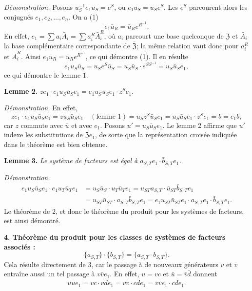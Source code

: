 \noindent\emph{Démonstration.} Posons \(u_S^{-1}e_1u_S=e^S\), ou \(e_1u_S=u_Se^S\). Les \(e^S\) parcourent alors les conjugués \(e_1,e_2,\ldots,e_n\). On a (1)
\[
e_1\bar u_R=\bar u_Re^{R^{-1}}.
\]
En effet, \(e_1=\sum a_i\bar A_i=\sum a_i^R\bar A_i^R\), où \(a_i\) parcourt une base quelconque de \(\mathfrak Z\) et \(\bar A_i\) la base complémentaire correspondante de \(\overline{\mathfrak Z}\); la même relation vaut donc pour \(a_i^R\) et \(\bar A_i^R\). Ainsi \(e_1\bar u_R=\bar u_Re^{R^{-1}}\), ce qui démontre (1). Il en résulte
\[
e_1u_S\bar u_S=u_Se^S\bar u_S=u_S\bar u_S\cdot e^{SS^{-1}}=u_S\bar u_Se_1,
\]
ce qui démontre le lemme 1.

\noindent\textbf{Lemme 2.} \(ze_1\cdot e_1u_S\bar u_Se_1=e_1u_S\bar u_Se_1\cdot z^Se_1\).

\noindent\emph{Démonstration.} En effet,
\[
ze_1\cdot e_1u_S\bar u_Se_1
=zu_S\bar u_Se_1\quad(\text{lemme 1})
=u_Sz^S\bar u_Se_1
=u_S\bar u_Se_1\cdot z^Se_1
=b=e_1b,
\]
car \(z\) commute avec \(\bar u\) et avec \(e_1\). Posons \(u'=u_S\bar u_Se_1\). Le lemme 2 affirme que \(u'\) indexe les substitutions de \(\mathfrak Ze_1\), de sorte que la représentation croisée indiquée dans le théorème est bien obtenue.

\noindent\textbf{Lemme 3.} \emph{Le système de facteurs est égal à \(a_{S,T}e_1\cdot\bar b_{S,T}e_1\).}

\noindent\emph{Démonstration.}
\[
\begin{aligned}
e_1u_S\bar u_Se_1\cdot e_1u_T\bar u_Te_1
&=u_S\bar u_S\cdot u_T\bar u_Te_1
 =u_{ST}a_{S,T}\cdot\bar u_{ST}\bar b_{S,T}e_1\\
&=u_{ST}\bar u_{ST}\cdot a_{S,T}\bar b_{S,T}e_1
 =e_1u_{ST}\bar u_{ST}e_1\cdot a_{S,T}e_1\cdot\bar b_{S,T}e_1.
\end{aligned}
\]
Le théorème de 2, et donc le théorème du produit pour les systèmes de facteurs, est ainsi démontré.

\noindent\textbf{4. Théorème du produit pour les classes de systèmes de facteurs associés :}
\[
\{a_{S,T}\}\cdot\{b_{S,T}\}=\{a_{S,T}\cdot b_{S,T}\}.
\]
Cela résulte directement de 3, car le passage à de nouveaux générateurs \(v\) et \(\bar v\) entraîne aussi un tel passage à \(v\bar ve_1\). En effet, \(u=vc\) et \(\bar u=\bar v\bar d\) donnent
\[
u\bar ue_1=vc\cdot\bar v\bar de_1=v\bar v\cdot c\bar de_1=v\bar ve_1\cdot c\bar de_1.
\]

